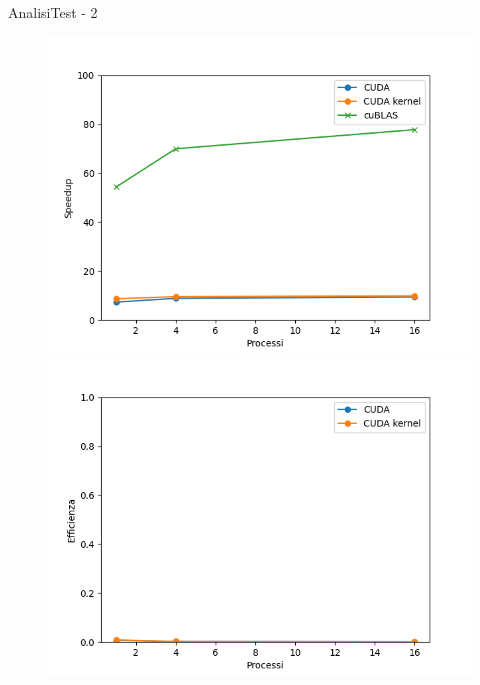 \begin{frame}{Analisi}{Test - 2}
    \begin{figure}[H]
        \centering
        \begin{minipage}{0.49\textwidth}
            \includegraphics[width=\textwidth]{./imgs/graphs/caso_b_speedup.png}
        \end{minipage}
        \begin{minipage}{0.49\textwidth}
            \includegraphics[width=\textwidth]{./imgs/graphs/caso_b_efficiency.png}
        \end{minipage}
    \end{figure}
\end{frame}

